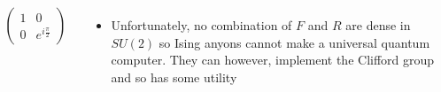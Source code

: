 \documentclass[20pt,,margin=1in,innermargin=-4.5in,blockverticalspace=-0.25in]{tikzposter}
\begin{document}
\begin{columns}
{\begin{align*}
            \begin{pmatrix}
                1&0\\0&e^{i\frac{\pi}{2}}
            \end{pmatrix}
        \end{align*}
        \begin{itemize}
            \item Unfortunately, no combination of $F$ and $R$ are dense in $SU(2)$ so Ising anyons cannot make a universal quantum computer. They can however, implement the Clifford group and so has some utility
        \end{itemize}
    }
    
\end{columns}
\end{document}
